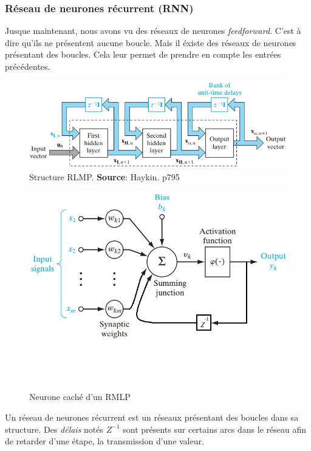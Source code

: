 \subsubsection{Réseau de neurones récurrent (RNN)}
Jusque maintenant, nous avons vu des réseaux de neurones \emph{feedforward}.
C'est à dire qu'ils ne présentent aucune boucle. Mais il éxiste des réseaux de neurones présentant des boucles.
Cela leur permet de prendre en compte les entrées précédentes.
\begin{figure}
 \centering
 \includegraphics[scale=0.5]{../figures/structurermlp.jpg}
 \caption{Structure RLMP. \textbf{Source}: Haykin. p795\cite{Haykin}}
 \label{structurermlp}
\end{figure}
\begin{figure}
 \centering
 \includegraphics[scale=0.5]{../figures/neuronermlp.jpg}
 \caption{Neurone caché d'un RMLP}
 \label{neuronermlp}
\end{figure}
Un réseau de neurones récurrent est un réseaux présentant des boucles dans sa structure.
Des \emph{délais} notés $Z^{-1}$ sont présents sur certains arcs dans le réseau afin de retarder d'une étape, la transmission d'une valeur.
